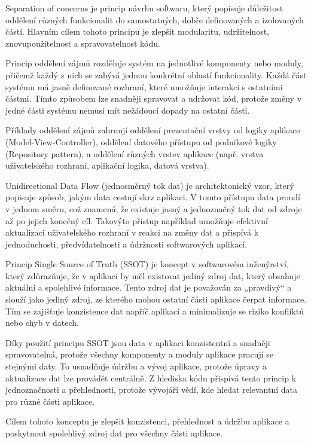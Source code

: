Separation of concerns je princip návrhu softwaru, který popisuje důležitost oddělení různých funkcionalit do samostatných, dobře definovaných a izolovaných částí.
Hlavním cílem tohoto principu je zlepšit modularitu, udržitelnost, znovupoužitelnost a spravovatelnost kódu.

Princip oddělení zájmů rozděluje systém na jednotlivé komponenty nebo moduly, přičemž každý z nich se zabývá jednou konkrétní 
oblastí funkcionality. Každá část systému má jasně definované rozhraní, které umožňuje interakci s ostatními částmi. 
Tímto způsobem lze snadněji spravovat a udržovat kód, protože změny v jedné části systému nemusí mít nežádoucí dopady na ostatní části.

Příklady oddělení zájmů zahrnují oddělení prezentační vrstvy od logiky aplikace (Model-View-Controller), oddělení datového přístupu od 
podnikové logiky (Repository pattern), a oddělení různých vrstev aplikace (např. vrstva uživatelského rozhraní, aplikační logika, datová vrstva). 

Unidirectional Data Flow (jednosměrný tok dat) je architektonický vzor, který popisuje způsob, jakým data cestují skrz aplikaci. 
V tomto přístupu data proudí v jednom směru, což znamená, že existuje jasný a jednoznačný tok dat od zdroje až po jejich konečný cíl.
Takovýto přístup například umožňuje efektivní aktualizaci uživatelského rozhraní v reakci na změny dat a přispívá k jednoduchosti, 
předvídatelnosti a údržnosti softwarových aplikací.

Princip Single Source of Truth (SSOT) je koncept v softwarovém inženýrství, který zdůrazňuje, že v aplikaci by měl existovat jediný 
zdroj dat, který obsahuje aktuální a spolehlivé informace. Tento zdroj dat je považován za „pravdivý“ a slouží jako jediný zdroj, 
ze kterého mohou ostatní části aplikace čerpat informace. Tím se zajišťuje konzistence dat napříč aplikací a minimalizuje se riziko 
konfliktů nebo chyb v datech.

Díky použití principu SSOT jsou data v aplikaci konzistentní a snadněji spravovatelná, protože všechny komponenty a moduly aplikace pracují se stejnými 
daty. To usnadňuje údržbu a vývoj aplikace, protože úpravy a aktualizace dat lze provádět centrálně. Z hlediska kódu přispívá tento
princip k jednoznačnosti a přehlednosti, protože vývojáři vědí, kde hledat relevantní data pro různé části aplikace.

Cílem tohoto konceptu je zlepšit konzistenci, přehlednost a údržbu aplikace a poskytnout spolehlivý zdroj dat pro všechny části aplikace.


